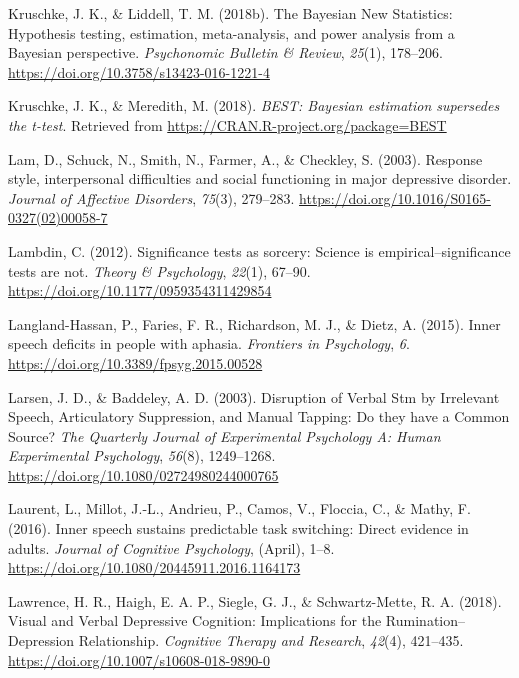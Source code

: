 \documentclass[a4paper,12pt,twoside,openright,oldfontcommands]{memoir}
\begin{document}
\leavevmode\hypertarget{ref-kruschke_bayesian_2018-1}{}%
Kruschke, J. K., \& Liddell, T. M. (2018b). The Bayesian New Statistics: Hypothesis testing, estimation, meta-analysis, and power analysis from a Bayesian perspective. \emph{Psychonomic Bulletin \& Review}, \emph{25}(1), 178--206. \url{https://doi.org/10.3758/s13423-016-1221-4}

\leavevmode\hypertarget{ref-R-BEST}{}%
Kruschke, J. K., \& Meredith, M. (2018). \emph{BEST: Bayesian estimation supersedes the t-test}. Retrieved from \url{https://CRAN.R-project.org/package=BEST}

\leavevmode\hypertarget{ref-lam_response_2003}{}%
Lam, D., Schuck, N., Smith, N., Farmer, A., \& Checkley, S. (2003). Response style, interpersonal difficulties and social functioning in major depressive disorder. \emph{Journal of Affective Disorders}, \emph{75}(3), 279--283. \url{https://doi.org/10.1016/S0165-0327(02)00058-7}

\leavevmode\hypertarget{ref-Lambdin2012}{}%
Lambdin, C. (2012). Significance tests as sorcery: Science is empirical--significance tests are not. \emph{Theory \& Psychology}, \emph{22}(1), 67--90. \url{https://doi.org/10.1177/0959354311429854}

\leavevmode\hypertarget{ref-langland-hassan_inner_2015}{}%
Langland-Hassan, P., Faries, F. R., Richardson, M. J., \& Dietz, A. (2015). Inner speech deficits in people with aphasia. \emph{Frontiers in Psychology}, \emph{6}. \url{https://doi.org/10.3389/fpsyg.2015.00528}

\leavevmode\hypertarget{ref-larsen_disruption_2003}{}%
Larsen, J. D., \& Baddeley, A. D. (2003). Disruption of Verbal Stm by Irrelevant Speech, Articulatory Suppression, and Manual Tapping: Do they have a Common Source? \emph{The Quarterly Journal of Experimental Psychology A: Human Experimental Psychology}, \emph{56}(8), 1249--1268. \url{https://doi.org/10.1080/02724980244000765}

\leavevmode\hypertarget{ref-Laurent2016}{}%
Laurent, L., Millot, J.-L., Andrieu, P., Camos, V., Floccia, C., \& Mathy, F. (2016). Inner speech sustains predictable task switching: Direct evidence in adults. \emph{Journal of Cognitive Psychology}, (April), 1--8. \url{https://doi.org/10.1080/20445911.2016.1164173}

\leavevmode\hypertarget{ref-lawrence_visual_2018}{}%
Lawrence, H. R., Haigh, E. A. P., Siegle, G. J., \& Schwartz-Mette, R. A. (2018). Visual and Verbal Depressive Cognition: Implications for the Rumination--Depression Relationship. \emph{Cognitive Therapy and Research}, \emph{42}(4), 421--435. \url{https://doi.org/10.1007/s10608-018-9890-0}
\end{document}
